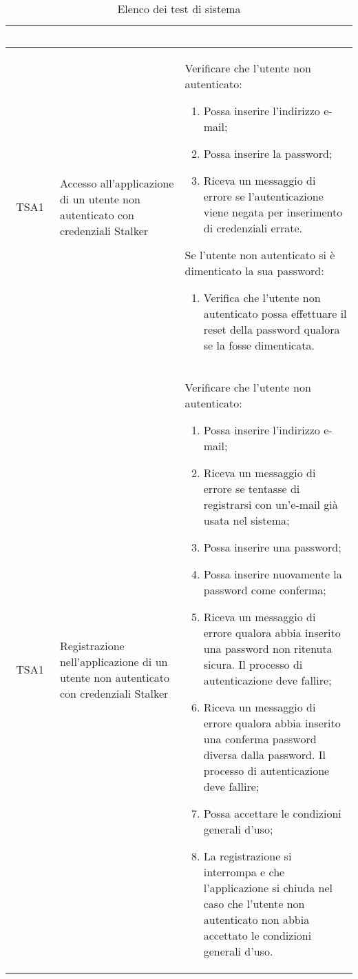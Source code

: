 {
\renewcommand{\arraystretch}{1.5}
\centering
\begin{longtable}{ c  C{3cm}  C{11cm} }
\caption{Elenco dei test di sistema}\\
\textcolor{white}{\textbf{Codice}} & \textcolor{white}{\textbf{Titolo}} & \textcolor{white}{\textbf{Descrizione}} \\
\hline
\endhead

TSA1 & Accesso all'applicazione di un utente non autenticato con credenziali Stalker &
Verificare che l'utente non autenticato:
\begin{enumerate}
    \item Possa inserire l'indirizzo e-mail;
    \item Possa inserire la password;
    \item Riceva un messaggio di errore se l'autenticazione viene negata per inserimento di credenziali errate.
\end{enumerate}
Se l'utente non autenticato si è dimenticato la sua password:
\begin{enumerate}
    \item Verifica che l'utente non autenticato possa effettuare il reset della password qualora se la fosse dimenticata.
\end{enumerate} \\

TSA1 & Registrazione nell'applicazione di un utente non autenticato con credenziali Stalker &
Verificare che l'utente non autenticato:
\begin{enumerate}
    \item Possa inserire l'indirizzo e-mail;
    \item Riceva un messaggio di errore se tentasse di registrarsi con un'e-mail già usata nel sistema;
    \item Possa inserire una password;
    \item Possa inserire nuovamente la password come conferma;
    \item Riceva un messaggio di errore qualora abbia inserito una password non ritenuta sicura. Il processo di autenticazione deve fallire;
    \item Riceva un messaggio di errore qualora abbia inserito una conferma password diversa dalla password. Il processo di autenticazione deve fallire;
    \item Possa accettare le condizioni generali d'uso;
    \item La registrazione si interrompa e che l'applicazione si chiuda nel caso che l'utente non autenticato non abbia accettato le condizioni generali d'uso.
\end{enumerate} \\


\end{longtable}}
